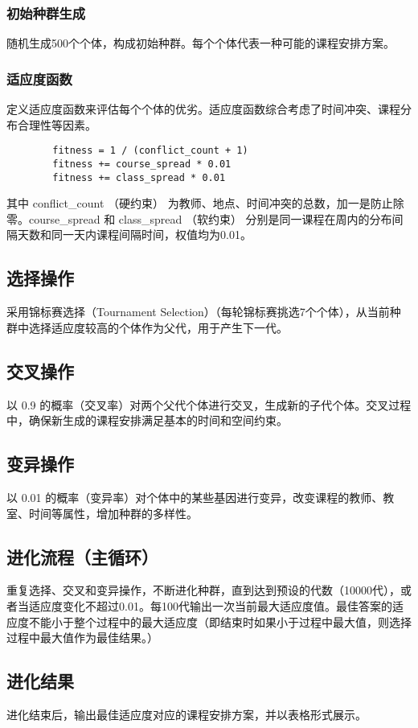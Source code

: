 \documentclass{ctexart}
\begin{document}
	\subsubsection{初始种群生成}
	随机生成500个个体，构成初始种群。每个个体代表一种可能的课程安排方案。
	\subsubsection{适应度函数}
	定义适应度函数来评估每个个体的优劣。适应度函数综合考虑了时间冲突、课程分布合理性等因素。
	\begin{verbatim}
		fitness = 1 / (conflict_count + 1)
		fitness += course_spread * 0.01
		fitness += class_spread * 0.01
	\end{verbatim}
	\vspace{-20pt}
	其中 conflict\_count （硬约束） 为教师、地点、时间冲突的总数，加一是防止除零。course\_spread 和 
	class\_spread （软约束） 分别是同一课程在周内的分布间隔天数和同一天内课程间隔时间，权值均为0.01。
	\subsection{选择操作}
	采用锦标赛选择（Tournament Selection）（每轮锦标赛挑选7个个体），从当前种群中选择适应度较高的个体作为父代，用于产生下一代。
	\subsection{交叉操作}
	以 0.9 的概率（交叉率）对两个父代个体进行交叉，生成新的子代个体。交叉过程中，确保新生成的课程安排满足基本的时间和空间约束。
	\subsection{变异操作}
	以 0.01 的概率（变异率）对个体中的某些基因进行变异，改变课程的教师、教室、时间等属性，增加种群的多样性。
	\subsection{进化流程（主循环）}
	重复选择、交叉和变异操作，不断进化种群，直到达到预设的代数（10000代），或者当适应度变化不超过0.01。每100代输出一次当前最大适应度值。最佳答案的适应度不能小于整个过程中的最大适应度（即结束时如果小于过程中最大值，则选择过程中最大值作为最佳结果。）
	\subsection{进化结果}
	进化结束后，输出最佳适应度对应的课程安排方案，并以表格形式展示。
	
\end{document}
